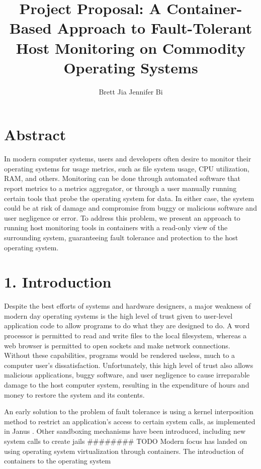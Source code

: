 \documentclass{proc}
\begin{document}
\title{Project Proposal: A Container-Based Approach to Fault-Tolerant Host Monitoring on Commodity Operating Systems}

\author{Brett Jia \hspace{1em} Jennifer Bi}

\maketitle

\section*{Abstract}

In modern computer systems, users and developers often desire to monitor their operating systems for usage metrics, such as file system usage, CPU utilization, RAM, and others. Monitoring can be done through automated software that report metrics to a metrics aggregator, or through a user manually running certain tools that probe the operating system for data. In either case, the system could be at risk of damage and compromise from buggy or malicious software and user negligence or error. To address this problem, we present an approach to running host monitoring tools in containers with a read-only view of the surrounding system, guaranteeing fault tolerance and protection to the host operating system.

\section*{1. Introduction}

Despite the best efforts of systems and hardware designers, a major weakness of modern day operating systems is the high level of trust given to user-level application code to allow programs to do what they are designed to do. A word processor is permitted to read and write files to the local filesystem, whereas a web browser is permitted to open sockets and make network connections. Without these capabilities, programs would be rendered useless, much to a computer user's dissatisfaction. Unfortunately, this high level of trust also allows malicious applications, buggy software, and user negligence to cause irreparable damage to the host computer system, resulting in the expenditure of hours and money to restore the system and its contents.

An early solution to the problem of fault tolerance is using a kernel interposition method to restrict an application's access to certain system calls, as implemented in Janus \cite{goldberg1996janus}. Other sandboxing mechanisms have been introduced, including new system calls to create jails \cite{kamp2000jails}
######## TODO
Modern focus has landed on using operating system virtualization through containers. The introduction of containers to the operating system
\end{document}

